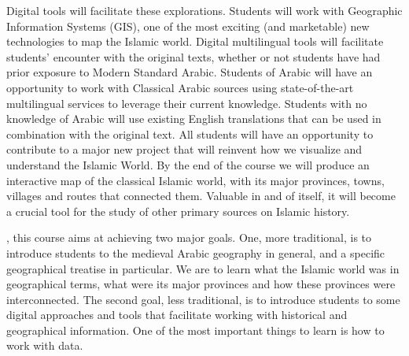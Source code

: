 \documentclass{tufte-handout} %
\begin{document}
Digital tools will facilitate these explorations. Students will work with Geographic Information Systems (GIS), one of the most exciting (and marketable) new technologies to map the Islamic world. Digital multilingual tools will facilitate students' encounter with the original texts, whether or not students have had prior exposure to Modern Standard Arabic. Students of Arabic will have an opportunity to work with Classical Arabic sources using state-of-the-art multilingual services to leverage their current knowledge. Students with no knowledge of Arabic will use existing English translations that can be used in combination with the original text. All students will have an opportunity to contribute to a major new project that will reinvent how we visualize and understand the Islamic World. By the end of the course we will produce an interactive map of the classical Islamic world, with its major provinces, towns, villages and routes that connected them. Valuable in and of itself, it will become a crucial tool for the study of other primary sources on Islamic history.

, this course aims at achieving two major goals. One, more traditional, is to introduce students to the medieval Arabic geography in general, and a specific geographical treatise in particular. We are to learn what the Islamic world was in geographical terms, what were its major provinces and how these provinces were interconnected. The second goal, less traditional, is to introduce students to some digital approaches and tools that facilitate working with historical and geographical information. One of the most important things to learn is how to work with data.
\end{document}
